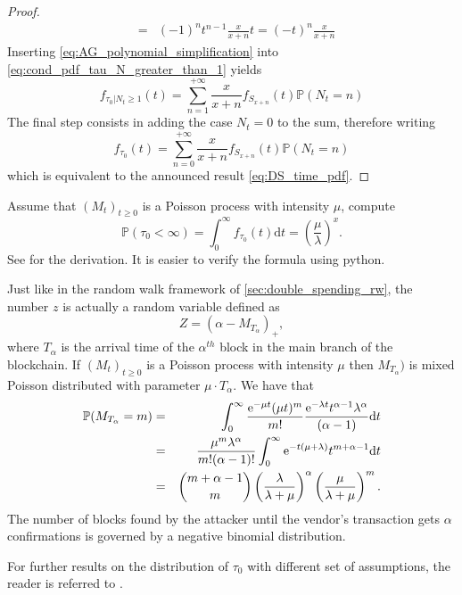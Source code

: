 \begin{proof}
\begin{eqnarray}
&=& (-1)^nt^{n-1}\frac{x}{x+n}t =(-t)^n\frac{x}{x+n} \label{eq:AG_polynomial_simplification}
\end{eqnarray}
Inserting \eqref{eq:AG_polynomial_simplification} into \eqref{eq:cond_pdf_tau_N_greater_than_1} yields
\begin{equation*}
f_{\tau_0|N_t\geq1}(t)=\sum_{n=1}^{+\infty}\frac{x}{x+n}f_{S_{x+n}}(t)\mathbb{P}(N_t=n)
\end{equation*}
The final step consists in adding the case $N_t=0$ to the sum, therefore writing
\begin{equation*}
f_{\tau_0}(t)=\sum_{n=0}^{+\infty}\frac{x}{x+n}f_{S_{x+n}}(t)\mathbb{P}(N_t=n)
\end{equation*}
which is equivalent to the announced result \eqref{eq:DS_time_pdf}.  
\end{proof}
\begin{exercise}
Assume that $(M_t)_{t\geq0}$ is a Poisson process with intensity $\mu$, compute 
\[
\mathbb{P}(\tau_0<\infty) = \int_0^{\infty}f_{\tau_0}(t)\text{d}t = \left(\frac{\mu}{\lambda}\right)^x.
\]
See \citet[Example 1]{Goffard2019} for the derivation. It is easier to verify the formula using python.  
\end{exercise}
\begin{remark}
Just like in the random walk framework of \cref{sec:double_spending_rw}, the number $z$ is actually a random variable defined as 
$$
Z = (\alpha - M_{T_\alpha})_+,
$$
where $T_\alpha$ is the arrival time of the $\alpha^{th}$ block in the main branch of the blockchain. If $(M_t)_{t\geq0}$ is a Poisson process with intensity $\mu$ then $M_{T_\alpha})$ is mixed Poisson distributed with parameter $\mu\cdot T_{\alpha}$. We have that 
\begin{eqnarray*}
\mathbb{P}(M_{T_\alpha} = m) &=& \int_{0}^{\infty}\frac{\mathrm{e}^{-\mu t}(\mu t)^m}{m!}\frac{\mathrm{e}^{-\lambda t}t^{\alpha-1}\lambda ^\alpha}{(\alpha -1)}\text{d}t\\
&=&\frac{\mu^m\lambda^{\alpha}}{m!(\alpha-1)!}\int_{0}^{\infty}\mathrm{e}^{-t(\mu + \lambda)}t^{m+\alpha-1}\text{d}t\\
&=&\binom{m+\alpha-1}{m}\left(\frac{\lambda}{\lambda+\mu}\right)^{\alpha}\left(\frac{\mu}{\lambda+\mu}\right)^{m}.
\end{eqnarray*}
The number of blocks found by the attacker until the vendor's transaction gets $\alpha$ confirmations is governed by a negative binomial distribution.
\end{remark}
\noindent For further results on the distribution of $\tau_0$ with different set of assumptions, the reader is referred to \citet{Goffard2019}.

